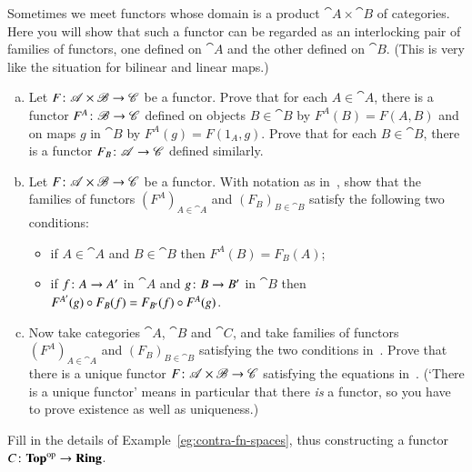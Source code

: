 \begin{question}
\label{ex:ftr-on-product}
Sometimes we meet functors whose domain is a product%
%
%
$\cat{A} \times \cat{B}$ of categories.  Here you will show that such a
functor can be regarded as an interlocking pair of families of functors,
one defined on $\cat{A}$ and the other defined on $\cat{B}$.  (This is very
like the situation for bilinear and linear maps.)
%
\begin{enumerate}[(b)]
\item
\label{part:prod-ftr-compts}
Let $F\from \cat{A} \times \cat{B} \to \cat{C}$ be a functor.
Prove that for each $A \in \cat{A}$, there is a functor $F^A\from
\cat{B} \to \cat{C}$ defined on objects $B \in \cat{B}$ by $F^A(B) = F(A,
B)$ and on maps $g$ in $\cat{B}$ by $F^A(g) = F(1_A, g)$.  Prove that for
each $B \in \cat{B}$, there is a functor $F_B \from \cat{A} \to \cat{C}$
defined similarly.

\item
\label{part:prod-ftr-condns}
Let $F \from \cat{A} \times \cat{B} \to \cat{C}$ be a functor.  With
notation as in~, show that
the families of functors $(F^A)_{A \in \cat{A}}$ and $(F_B)_{B \in
  \cat{B}}$ satisfy the following two conditions:
%
\begin{itemize}
\item
if $A \in \cat{A}$ and $B \in \cat{B}$ then $F^A(B) = F_B(A)$;

\item
if $f\from A \to A'$ in $\cat{A}$ and $g\from B \to B'$ in $\cat{B}$ then
$F^{A'}(g) \mathbin{\circ} F_B(f) = F_{B'}(f) \mathbin{\circ} F^A(g)$.
\end{itemize}

\item
Now take categories $\cat{A}$, $\cat{B}$ and $\cat{C}$, and take families
of functors $(F^A)_{A \in \cat{A}}$ and $(F_B)_{B \in \cat{B}}$ satisfying
the two conditions in~.  Prove that there is a
unique functor $F\from \cat{A} \times \cat{B} \to \cat{C}$ satisfying the
equations in~.  (`There is a unique functor'
means in particular that there \emph{is} a functor, so you have to prove
existence as well as uniqueness.)
\end{enumerate}
\end{question}


\begin{question}
\label{ex:contra-fn-spaces}
Fill in the details of Example~\ref{eg:contra-fn-spaces}, thus constructing
a functor $C\from \Tp^\op \to \Ring$.
\end{question}


